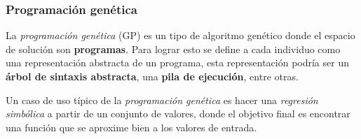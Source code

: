 \subsubsection{Programación genética}
  La \textit{programación genética} (GP) \cite{langdon_genetic_1998} es un tipo de algoritmo 
  genético donde el espacio de solución son \textbf{programas}.
  Para lograr esto se define a cada individuo como una representación abstracta de un programa, esta
  representación podría ser un \textbf{árbol de sintaxis abstracta}, una \textbf{pila de ejecución},
  entre otras.

  Un caso de uso típico de la \textit{programación genética} es hacer una \textit{regresión 
  simbólica} \cite{poli_field_2008} a partir de un conjunto de valores, donde el objetivo final es 
  encontrar una función que se aproxime bien a los valores de entrada.